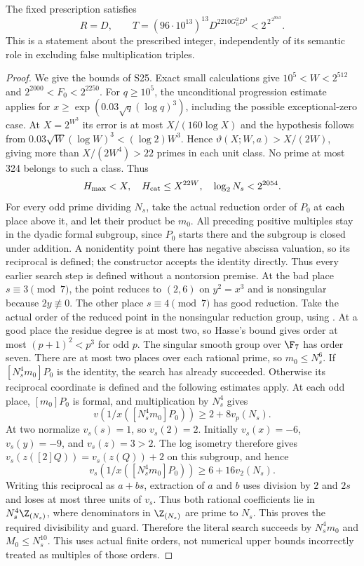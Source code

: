 \begin{proposition}\label{prop:cutoff}
The fixed prescription satisfies
\[
 R=D,\qquad T=(96\cdot10^{13})^{13}D^{2210G_0^2D^3}
            <2^{\,2^{\,2^{9013}}}.
\]
This is a statement about the prescribed integer, independently of its
semantic role in excluding false multiplication triples.
\end{proposition}
\begin{proof}
We give the bounds of S25. Exact small calculations give
$10^5<W<2^{512}$ and $2^{2000}<F_0<2^{2250}$.
For $q\ge10^5$, the unconditional progression estimate
\cite[Theorem 1.2, (1.10)--(1.11), Corollary 6.17 with $A=1$]{bmor}
applies for $x\ge\exp(0.03\sqrt q(\log q)^3)$, including the possible
exceptional-zero case. At $X=2^{W^3}$ its error is at most
$X/(160\log X)$ and the hypothesis follows from
$0.03\sqrt W(\log W)^3<(\log2)W^3$.
Hence $\vartheta(X;W,a)>X/(2W)$, giving more than
$X/(2W^4)>22$ primes in each unit class. No prime at most 324
belongs to such a class. Thus
\[
 H_{\max}<X,\quad H_{\rm cat}\le X^{22W},\quad
 \log_2N_s<2^{2054}.
\]
For every odd prime dividing $N_s$, take the actual reduction order of
$P_0$ at each place above it, and let their product be $m_0$.
All preceding positive multiples stay in the dyadic formal subgroup,
since $P_0$ starts there and the subgroup is closed under addition.
A nonidentity point there has negative abscissa valuation, so its
reciprocal is defined; the constructor accepts the identity directly.
Thus every earlier search step is defined without a nontorsion premise.
At the bad place $s\equiv3\pmod7$, the point reduces to $(2,6)$
on $y^2=x^3$ and is nonsingular because $2y\not\equiv0$.
The other place $s\equiv4\pmod7$ has good reduction.
Take the actual order of the reduced point in the nonsingular
reduction group, using
\cite[VII.2.1, p.~188]{silverman}.
At a good place the residue degree is at most two, so Hasse's
bound \cite[V.1.1, p.~138]{silverman} gives order at most
$(p+1)^2<p^3$ for odd $p$. The singular smooth group over
$\F_7$ has order seven. There are at most two places over each
rational prime, so $m_0\le N_s^6$.
If $[N_s^4m_0]P_0$ is the identity, the search has already succeeded.
Otherwise its reciprocal coordinate is defined and the following
estimates apply. At each odd place, $[m_0]P_0$ is formal, and multiplication by
$N_s^4$ gives
\[
 v(1/x([N_s^4m_0]P_0))\ge2+8v_p(N_s).
\]
At two normalize $v_s(s)=1$, so $v_s(2)=2$. Initially
$v_s(x)=-6$, $v_s(y)=-9$, and $v_s(z)=3>2$.
The log isometry therefore gives
$v_s(z([2]Q))=v_s(z(Q))+2$ on this subgroup, and hence
\[
 v_s(1/x([N_s^4m_0]P_0))\ge6+16v_2(N_s).
\]
Writing this reciprocal as $a+bs$, extraction of $a$ and $b$
uses division by $2$ and $2s$ and loses at most three units of
$v_s$. Thus both rational coefficients lie in
$N_s^4\Z_{(N_s)}$, where denominators in $\Z_{(N_s)}$ are
prime to $N_s$. This proves the required divisibility and guard. Therefore the literal search
succeeds by $N_s^4m_0$ and $M_0\le N_s^{10}$.
This uses actual finite orders, not numerical upper bounds incorrectly
treated as multiples of those orders.


\end{proof}
